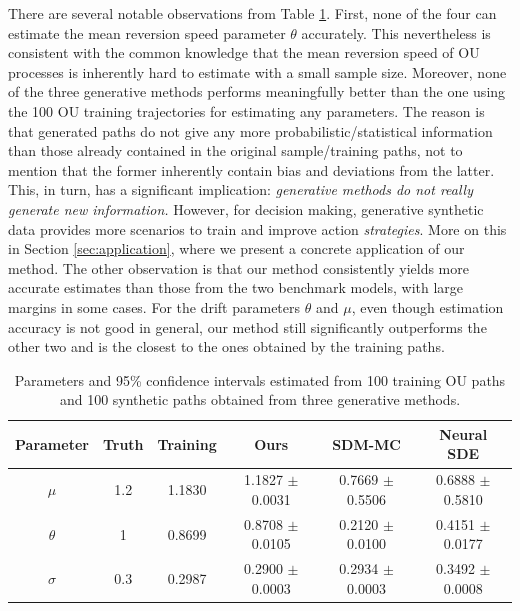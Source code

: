 \documentclass[11pt]{article}
\begin{document}
There are several notable observations from Table \ref{table: 1D_OU_params}. First, none of the four can estimate the mean reversion speed parameter $\theta$ accurately. This nevertheless is consistent with the common knowledge that  the mean reversion speed of OU processes is inherently hard to estimate with a small sample size. Moreover, none of the three generative methods performs meaningfully better  than the one using the 100 OU training trajectories for estimating any parameters. The reason is that generated paths do not give any more probabilistic/statistical information than those already contained in the original sample/training paths, not to mention that the former inherently contain bias and deviations from the latter.
This, in turn, has a significant implication: {\it generative methods do not really generate new information.} However, for decision making, generative synthetic data provides more scenarios to train and improve action {\it strategies}. More on this in Section \ref{sec:application}, where we present a concrete application of our method. The other observation is that our method consistently yields more accurate estimates than those from the two benchmark models, with large margins in some cases. For the drift parameters $\theta$ and $\mu$, even though estimation accuracy is not good in general, our method still significantly outperforms the other two and is the closest to the ones obtained by the training paths.


\begin{table}[htp]
    \centering
    \begin{tabular}{c c | c | c c c}
    \toprule
    Parameter & Truth & Training & Ours & SDM-MC & Neural SDE\\
    \hline
     $\mu$ & 1.2 & 1.1830  & 1.1827 $\pm$ 0.0031 & 0.7669 $\pm$ 0.5506 & 0.6888 $\pm$ 0.5810\\
     $\theta$ & 1 & 0.8699 & 0.8708 $\pm$ 0.0105 & 0.2120 $\pm$ 0.0100 & 0.4151 $\pm$ 0.0177\\
     $\sigma$ & 0.3  & 0.2987 & 0.2900 $\pm$ 0.0003 & 0.2934 $\pm$ 0.0003 & 0.3492 $\pm$ 0.0008\\
    \bottomrule
    \end{tabular}
    \caption{Parameters and 95\% confidence intervals estimated from 100 training OU paths and 100 synthetic paths obtained from three generative methods.}
    \label{table: 1D_OU_params}
\end{table}
\end{document}
